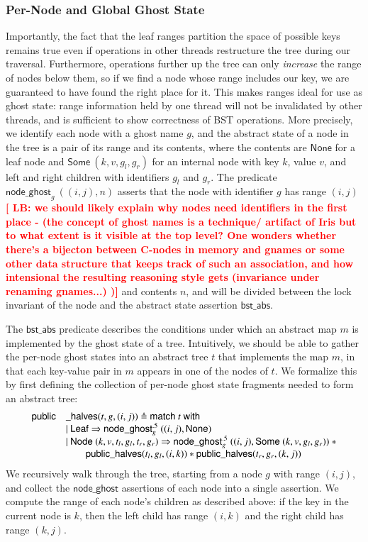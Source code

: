 \documentclass[runningheads]{llncs}
\newcommand{\LB}[1]{\textbf{\textcolor{red}{[ LB: #1]}}}
\newcommand{\treerep}{\ensuremath{\mathsf{bst\_abs}}}
\newcommand{\nodeghost}[2]{\ensuremath{\mathsf{node\_ghost}_{#1}\ (#2)}}
\newcommand{\publichalf}[2]{\ensuremath{\mathsf{node\_ghost}^{.5}_{#1}\ (#2)}}
\begin{document}
\subsubsection{Per-Node and Global Ghost State}
Importantly, the fact that the leaf ranges partition the space of possible keys remains true even if operations in other threads restructure the tree during our traversal. Furthermore, operations further up the tree can only \emph{increase} the range of nodes below them, so if we find a node whose range includes our key, we are guaranteed to have found the right place for it. This makes ranges ideal for use as ghost state: range information held by one thread will not be invalidated by other threads, and is sufficient to show correctness of BST operations. More precisely, we identify each node with a ghost name $g$, and the abstract state of a node in the tree is a pair of its range and its contents, where the contents are $\mathsf{None}$ for a leaf node and $\mathsf{Some}\ (k, v, g_l, g_r)$ for an internal node with key $k$, value $v$, and left and right children with identifiers $g_l$ and $g_r$. The predicate $\nodeghost{g}{(i, j), n}$ asserts that the node with identifier $g$ has range $(i, j)$ \LB{we should likely explain why nodes need identifiers in the first place - (the concept of ghost names is a technique/ artifact of Iris but to what extent is it visible at the top level? One wonders whether there's a bijecton between C-nodes in memory and gnames or some other data structure that keeps track of such an association, and how intensional the resulting reasoning style gets (invariance under renaming gnames...) )} and contents $n$, and will be divided between the lock invariant of the node and the abstract state assertion $\treerep$.

The $\treerep$ predicate describes the conditions under which an abstract map $m$ is implemented by the ghost state of a tree. Intuitively, we should be able to gather the per-node ghost states into an abstract tree $t$ that implements the map $m$, in that each key-value pair in $m$ appears in one of the nodes of $t$. We formalize this by first defining the collection of per-node ghost state fragments needed to form an abstract tree:
$$\begin{array}{r l}
\mathsf{public}&\mathsf{\_halves}(t, g, (i, j)) \triangleq \mathsf{match}\ t\ \mathsf{with}\\
& |\ \mathsf{Leaf} \Rightarrow \publichalf{g}{(i, j), \mathsf{None}}\\
& |\ \mathsf{Node}\ (k, v, t_l, g_l, t_r, g_r) \Rightarrow \publichalf{g}{(i, j), \mathsf{Some}\ (k, v, g_l, g_r)}\ * \\&\qquad\mathsf{public\_halves}(t_l, g_l, (i, k)) * \mathsf{public\_halves}(t_r, g_r, (k, j))
\end{array}$$
We recursively walk through the tree, starting from a node $g$ with range $(i, j)$, and collect the $\mathsf{node\_ghost}$ assertions of each node into a single assertion. We compute the range of each node's children as described above: if the key in the current node is $k$, then the left child has range $(i, k)$ and the right child has range $(k, j)$.
\end{document}
